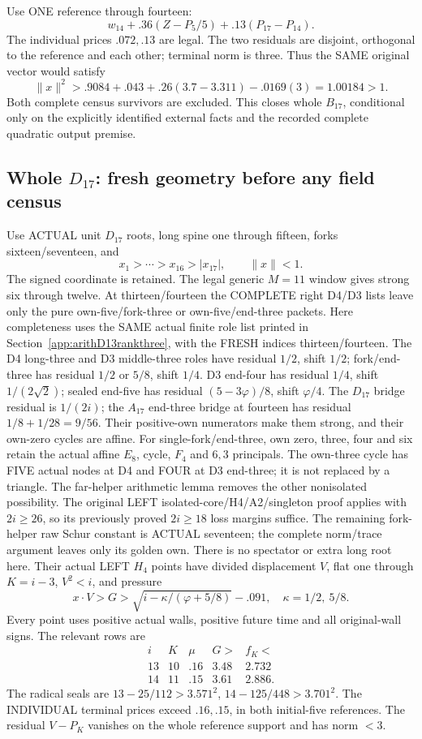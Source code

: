 \documentclass[11pt]{article}
\begin{document}
Use ONE reference through fourteen:
\[
                   w_{14}+.36(Z-P_5/5)+.13(P_{17}-P_{14}).
\]
The individual prices \(.072,.13\) are legal.
The two residuals are disjoint, orthogonal to
the reference and each other; terminal norm is three.
Thus the SAME original vector would satisfy
\[
 \|x\|^2>.9084+.043+.26(3.7-3.311)-.0169(3)
                              =1.00184>1 .
\]
Both complete census survivors are excluded.
This closes whole \(B_{17}\), conditional only
on the explicitly identified external facts and
the recorded complete quadratic output premise.

\subsection{Whole \(D_{17}\): fresh geometry before any field census}
\label{app:arithD17geometry}

Use ACTUAL unit \(D_{17}\) roots, long spine one
through fifteen, forks sixteen/seventeen, and
\[
 x_1>\cdots>x_{16}>|x_{17}|,\qquad\|x\|<1 .
\]
The signed coordinate is retained.
The legal generic \(M=11\) window gives strong
six through twelve.
At thirteen/fourteen the COMPLETE right D4/D3
lists leave only the pure own-five/fork-three
or own-five/end-three packets.
Here completeness uses the SAME actual finite
role list printed in Section~\ref{app:arithD13rankthree},
with the FRESH indices thirteen/fourteen.
The D4 long-three and D3 middle-three roles have
residual \(1/2\), shift \(1/2\);
fork/end-three has residual \(1/2\) or \(5/8\),
shift \(1/4\).
D3 end-four has residual \(1/4\), shift
\(1/(2\sqrt2)\); sealed end-five has residual
\((5-3\varphi)/8\), shift \(\varphi/4\).
The \(D_{17}\) bridge residual is \(1/(2i)\);
the \(A_{17}\) end-three bridge at fourteen
has residual \(1/8+1/28=9/56\).
Their positive-own numerators make them strong,
and their own-zero cycles are affine.
For single-fork/end-three, own zero, three,
four and six retain the actual affine \(E_8\),
cycle, \(F_4\) and \(6,3\) principals.
The own-three cycle has FIVE actual nodes at
D4 and FOUR at D3 end-three; it is not
replaced by a triangle.
The far-helper arithmetic lemma removes the
other nonisolated possibility.
The original LEFT isolated-core/H4/A2/singleton
proof applies with \(2i\ge26\), so its previously
proved \(2i\ge18\) loss margins suffice.
The remaining fork-helper raw Schur constant
is ACTUAL seventeen; the complete norm/trace
argument leaves only its golden own.
There is no spectator or extra long root here.
Their actual LEFT \(H_4\) points have divided
displacement \(V\), flat one through \(K=i-3\),
\(V^2<i\), and pressure
\[
 x\cdot V>G>\sqrt{i-\kappa/(\varphi+5/8)}-.091,\quad
 \kappa=1/2,\ 5/8 .
\]
Every point uses positive actual walls, positive
future time and all original-wall signs.
The relevant rows are
\[
\begin{array}{c|c|c|c|c}
 i&K&\mu&G>&f_K<\\ \hline
13&10&.16&3.48&2.732\\
14&11&.15&3.61&2.886 .
\end{array}
\]
The radical seals are
\(13-25/112>3.571^2\),
\(14-125/448>3.701^2\).
The INDIVIDUAL terminal prices exceed
\(.16,.15\), in both initial-five references.
The residual \(V-P_K\) vanishes on the whole
reference support and has norm \(<3\).
\end{document}
